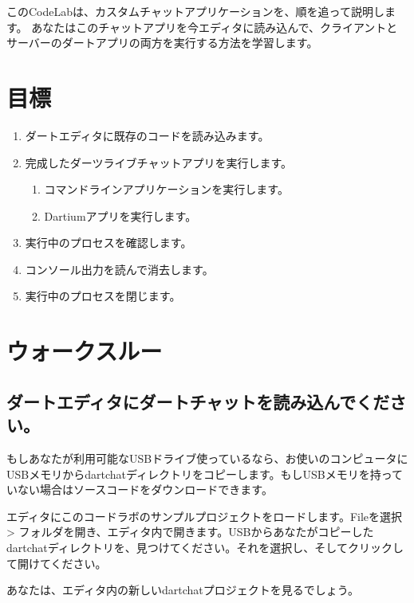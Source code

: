 
このCodeLabは、カスタムチャットアプリケーションを、順を追って説明します。
あなたはこのチャットアプリを今エディタに読み込んで、クライアントとサーバーのダートアプリの両方を実行する方法を学習します。

\section{目標}

\begin{enumerate}
\item ダートエディタに既存のコードを読み込みます。
\item 完成したダーツライブチャットアプリを実行します。
\begin{enumerate}
\item コマンドラインアプリケーションを実行します。
\item Dartiumアプリを実行します。
\end{enumerate}
\item 実行中のプロセスを確認します。
\item コンソール出力を読んで消去します。
\item 実行中のプロセスを閉じます。
\end{enumerate}

\section{ウォークスルー}

\subsection{ダートエディタにダートチャットを読み込んでください。}

もしあなたが利用可能なUSBドライブ使っているなら、お使いのコンピュータにUSBメモリからdartchatディレクトリをコピーします。もしUSBメモリを持っていない場合はソースコードをダウンロードできます。

エディタにこのコードラボのサンプルプロジェクトをロードします。Fileを選択 > フォルダを開き、エディタ内で開きます。USBからあなたがコピーしたdartchatディレクトリを、見つけてください。それを選択し、そしてクリックして開けてください。


あなたは、エディタ内の新しいdartchatプロジェクトを見るでしょう。


